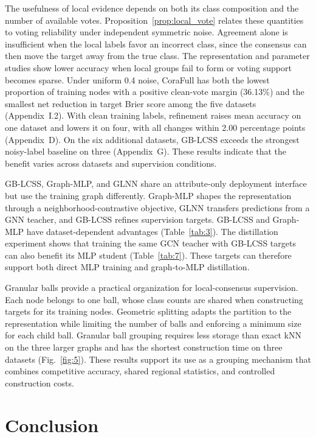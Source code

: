 \documentclass[a4paper,fleqn]{cas-sc}
\theoremstyle{definition}
\theoremstyle{plain}
\begin{document}
The usefulness of local evidence depends on both its class composition and the number of available votes. Proposition~\ref{prop:local_vote} relates these quantities to voting reliability under independent symmetric noise. Agreement alone is insufficient when the local labels favor an incorrect class, since the consensus can then move the target away from the true class. The representation and parameter studies show lower accuracy when local groups fail to form or voting support becomes sparse. Under uniform 0.4 noise, CoraFull has both the lowest proportion of training nodes with a positive clean-vote margin (36.13\%) and the smallest net reduction in target Brier score among the five datasets (Appendix~I.2). With clean training labels, refinement raises mean accuracy on one dataset and lowers it on four, with all changes within 2.00 percentage points (Appendix~D). On the six additional datasets, GB-LCSS exceeds the strongest noisy-label baseline on three (Appendix~G). These results indicate that the benefit varies across datasets and supervision conditions.

GB-LCSS, Graph-MLP, and GLNN share an attribute-only deployment interface but use the training graph differently. Graph-MLP shapes the representation through a neighborhood-contrastive objective, GLNN transfers predictions from a GNN teacher, and GB-LCSS refines supervision targets. GB-LCSS and Graph-MLP have dataset-dependent advantages (Table~\ref{tab:3}). The distillation experiment shows that training the same GCN teacher with GB-LCSS targets can also benefit its MLP student (Table~\ref{tab:7}). These targets can therefore support both direct MLP training and graph-to-MLP distillation.

Granular balls provide a practical organization for local-consensus supervision. Each node belongs to one ball, whose class counts are shared when constructing targets for its training nodes. Geometric splitting adapts the partition to the representation while limiting the number of balls and enforcing a minimum size for each child ball. Granular ball grouping requires less storage than exact kNN on the three larger graphs and has the shortest construction time on three datasets (Fig.~\ref{fig:5}). These results support its use as a grouping mechanism that combines competitive accuracy, shared regional statistics, and controlled construction costs.

\section{Conclusion}\label{sec:5}
\end{document}
